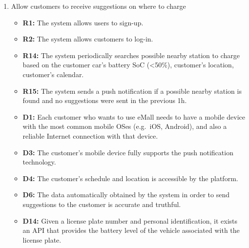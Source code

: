 \begin{enumerate}[label=\textbf{-G\arabic*}:]
          \item {Allow customers to receive suggestions on where to charge
          \begin{itemize}
            \item \textbf{R1:} The system allows users to sign-up.
            \item \textbf{R2:} The system allows customers to log-in.
            \item \textbf{R14:} The system periodically searches possible nearby station to charge based on the customer car's battery SoC (<50\%), customer's location, customer's calendar.
            \item \textbf{R15:} The system sends a push notification if a possible nearby station is found and no suggestions were sent in the previous 1h.
            \item \textbf{D1:} Each customer who wants to use eMall needs to have a mobile device with the most common mobile OSes (e.g.\ iOS, Android), and also a reliable Internet connection with that device.
            \item \textbf{D3:} The customer's mobile device fully supports the push notification technology.
            \item \textbf{D4:} The customer's schedule and location is accessible by the platform.
            \item \textbf{D6:} The data automatically obtained by the system in order to send suggestions to the customer is accurate and truthful.
            \item \textbf{D14:} Given a license plate number and personal identification, it exists an API that provides the battery level of the vehicle associated with the license plate.
              
          \end{itemize}
          }



\end{enumerate}
